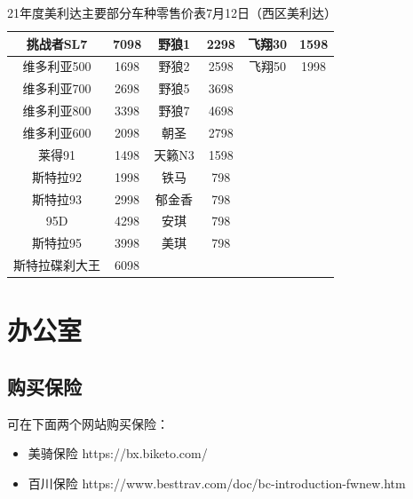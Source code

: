 \documentclass{ctexbook}
\begin{document}
\begin{table}[H]
\begin{tabular}{|c|c|c|c|c|c|}
    挑战者SL7                         & 7098       & 野狼1          & 2298       & 飞翔30         & 1598      \\ \hline
    维多利亚500                        & 1698       & 野狼2          & 2598       & 飞翔50         & 1998      \\ \hline
    维多利亚700                        & 2698       & 野狼5          & 3698       &              &           \\ \hline
    维多利亚800                        & 3398       & 野狼7          & 4698       &              &           \\ \hline
    维多利亚600                        & 2098       & 朝圣           & 2798       &              &           \\ \hline
    莱得91                           & 1498       & 天籁N3         & 1598       &              &           \\ \hline
    斯特拉92                          & 1998       & 铁马           & 798        &              &           \\ \hline
    斯特拉93                          & 2998       & 郁金香          & 798        &              &           \\ \hline
    95D                            & 4298       & 安琪           & 798        &              &           \\ \hline
    斯特拉95                          & 3998       & 美琪           & 798        &              &           \\ \hline
    斯特拉碟刹大王                        & 6098       &              &            &              &           \\ \hline
    \end{tabular}
    \caption{21年度美利达主要部分车种零售价表7月12日（西区美利达）}
\end{table} 
\section{办公室}
\subsection{购买保险}
可在下面两个网站购买保险：
\begin{itemize}
    \item 美骑保险 https://bx.biketo.com/
    \item 百川保险 https://www.besttrav.com/doc/bc-introduction-fwnew.htm
\end{itemize}
\end{document}
